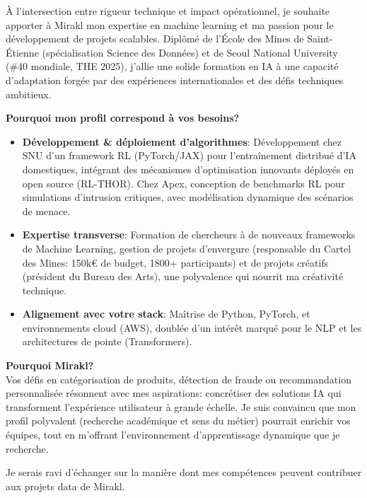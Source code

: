 \date{21 Mars 2025}

\makelettertitle

À l'intersection entre rigueur technique et impact opérationnel, je souhaite apporter à Mirakl mon expertise en machine learning et ma passion pour le développement de projets scalables. Diplômé de l'École des Mines de Saint-Étienne (spécialisation Science des Données) et de Seoul National University (\#40 mondiale, THE 2025), j'allie une solide formation en IA à une capacité d'adaptation forgée par des expériences internationales et des défis techniques ambitieux.

\textbf{Pourquoi mon profil correspond à vos besoins?}
\begin{itemize}
    \item \textbf{Développement \& déploiement d'algorithmes}:
          Développement chez SNU d'un framework RL (PyTorch/JAX) pour l'entraînement distribué d'IA domestiques, intégrant des mécanismes d'optimisation innovants déployés en open source (RL-THOR). Chez Apex, conception de benchmarks RL pour simulations d'intrusion critiques, avec modélisation dynamique des scénarios de menace.
    \item \textbf{Expertise transverse}: Formation de chercheurs à de nouveaux frameworks de Machine Learning, gestion de projets d'envergure (responsable du Cartel des Mines: 150k€ de budget, 1800+ participants) et de projets créatifs (président du Bureau des Arts), une polyvalence qui nourrit ma créativité technique.
    \item \textbf{Alignement avec votre stack}: Maîtrise de Python, PyTorch, et environnements cloud (AWS), doublée d'un intérêt marqué pour le NLP et les architectures de pointe (Transformers).
\end{itemize}
\vspace{7pt}

\textbf{Pourquoi Mirakl?}\\
Vos défis en catégorisation de produits, détection de fraude ou recommandation personnalisée résonnent avec mes aspirations: concrétiser des solutions IA qui transforment l'expérience utilisateur à grande échelle. Je suis convaincu que mon profil polyvalent (recherche académique et sens du métier) pourrait enrichir vos équipes, tout en m'offrant l'environnement d'apprentissage dynamique que je recherche.

Je serais ravi d'échanger sur la manière dont mes compétences peuvent contribuer aux projets data de Mirakl.

\makeletterclosing
